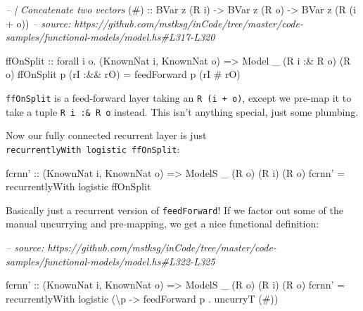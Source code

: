 \documentclass[]{article}
\newenvironment{Shaded}{}{}
\newcommand{\CommentTok}[1]{\textcolor[rgb]{0.38,0.63,0.69}{\textit{#1}}}
\newcommand{\DataTypeTok}[1]{\textcolor[rgb]{0.56,0.13,0.00}{#1}}
\newcommand{\FunctionTok}[1]{\textcolor[rgb]{0.02,0.16,0.49}{#1}}
\newcommand{\NormalTok}[1]{#1}
\newcommand{\OtherTok}[1]{\textcolor[rgb]{0.00,0.44,0.13}{#1}}
\begin{document}
\begin{Shaded}
\begin{Highlighting}[]
\CommentTok{-- | Concatenate two vectors}
\OtherTok{(#) ::} \DataTypeTok{BVar}\NormalTok{ z (}\DataTypeTok{R}\NormalTok{ i) }\OtherTok{->} \DataTypeTok{BVar}\NormalTok{ z (}\DataTypeTok{R}\NormalTok{ o) }\OtherTok{->} \DataTypeTok{BVar}\NormalTok{ z (}\DataTypeTok{R}\NormalTok{ (i }\FunctionTok{+}\NormalTok{ o))}
\CommentTok{-- source: https://github.com/mstksg/inCode/tree/master/code-samples/functional-models/model.hs#L317-L320}

\NormalTok{ffOnSplit}
\OtherTok{    ::}\NormalTok{ forall i o}\FunctionTok{.}\NormalTok{ (}\DataTypeTok{KnownNat}\NormalTok{ i, }\DataTypeTok{KnownNat}\NormalTok{ o)}
    \OtherTok{=>} \DataTypeTok{Model}\NormalTok{ _ (}\DataTypeTok{R}\NormalTok{ i }\FunctionTok{:&} \DataTypeTok{R}\NormalTok{ o) (}\DataTypeTok{R}\NormalTok{ o)}
\NormalTok{ffOnSplit p (rI }\FunctionTok{:&&}\NormalTok{ rO) }\FunctionTok{=}\NormalTok{ feedForward p (rI }\FunctionTok{#}\NormalTok{ rO)}
\end{Highlighting}
\end{Shaded}

\texttt{ffOnSplit} is a feed-forward layer taking an \texttt{R\ (i\ +\ o)},
except we pre-map it to take a tuple \texttt{R\ i\ :\&\ R\ o} instead. This
isn't anything special, just some plumbing.

Now our fully connected recurrent layer is just
\texttt{recurrentlyWith\ logistic\ ffOnSplit}:

\begin{Shaded}
\begin{Highlighting}[]
\NormalTok{fcrnn'}
\OtherTok{    ::}\NormalTok{ (}\DataTypeTok{KnownNat}\NormalTok{ i, }\DataTypeTok{KnownNat}\NormalTok{ o)}
    \OtherTok{=>} \DataTypeTok{ModelS}\NormalTok{ _ (}\DataTypeTok{R}\NormalTok{ o) (}\DataTypeTok{R}\NormalTok{ i) (}\DataTypeTok{R}\NormalTok{ o)}
\NormalTok{fcrnn' }\FunctionTok{=}\NormalTok{ recurrentlyWith logistic ffOnSplit}
\end{Highlighting}
\end{Shaded}

Basically just a recurrent version of \texttt{feedForward}! If we factor out
some of the manual uncurrying and pre-mapping, we get a nice functional
definition:

\begin{Shaded}
\begin{Highlighting}[]
\CommentTok{-- source: https://github.com/mstksg/inCode/tree/master/code-samples/functional-models/model.hs#L322-L325}

\NormalTok{fcrnn'}
\OtherTok{    ::}\NormalTok{ (}\DataTypeTok{KnownNat}\NormalTok{ i, }\DataTypeTok{KnownNat}\NormalTok{ o)}
    \OtherTok{=>} \DataTypeTok{ModelS}\NormalTok{ _ (}\DataTypeTok{R}\NormalTok{ o) (}\DataTypeTok{R}\NormalTok{ i) (}\DataTypeTok{R}\NormalTok{ o)}
\NormalTok{fcrnn' }\FunctionTok{=}\NormalTok{ recurrentlyWith logistic (\textbackslash{}p }\OtherTok{->}\NormalTok{ feedForward p }\FunctionTok{.}\NormalTok{ uncurryT (}\FunctionTok{#}\NormalTok{))}
\end{Highlighting}
\end{Shaded}
\end{document}
